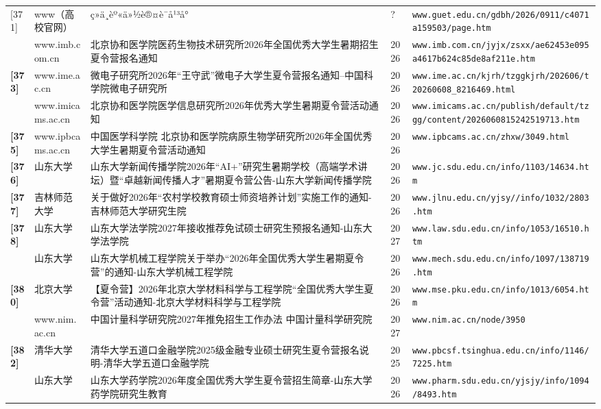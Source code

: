 {\begin{longtable}{@{}p{1.15cm}p{2.9cm}p{6.3cm}p{0.85cm}p{5.0cm}@{}}
[371] & www（高校官网） & ç»ä¸èº«ä»½è®¤è¯å¹³å° & ? & \texttt{www.guet.edu.cn/gdbh/2026/0911/c4071a159503/page.htm} \\
[372] & www.imb.com.cn & 北京协和医学院医药生物技术研究所2026年全国优秀大学生暑期招生夏令营报名通知 & 2026 & \texttt{www.imb.com.cn/jyjx/zsxx/ae62453e095a4617b624c85de8af211e.htm} \\
\textbf{[373]} & www.ime.ac.cn & 微电子研究所2026年“王守武”微电子大学生夏令营报名通知--中国科学院微电子研究所 & 2026 & \texttt{www.ime.ac.cn/kjrh/tzggkjrh/202606/t20260608\_8216469.html} \\
[374] & www.imicams.ac.cn & 北京协和医学院医学信息研究所2026年优秀大学生暑期夏令营活动通知 & 2026 & \texttt{www.imicams.ac.cn/publish/default/tzgg/content/2026060815242519713.htm} \\
\textbf{[375]} & www.ipbcams.ac.cn & 中国医学科学院 北京协和医学院病原生物学研究所2026年全国优秀大学生暑期夏令营活动通知 & 2026 & \texttt{www.ipbcams.ac.cn/zhxw/3049.html} \\
\textbf{[376]} & 山东大学 & 山东大学新闻传播学院2026年“AI+”研究生暑期学校（高端学术讲坛）暨“卓越新闻传播人才”暑期夏令营公告-山东大学新闻传播学院 & 2026 & \texttt{www.jc.sdu.edu.cn/info/1103/14634.htm} \\
\textbf{[377]} & 吉林师范大学 & 关于做好2026年“农村学校教育硕士师资培养计划”实施工作的通知-吉林师范大学研究生院 & 2026 & \texttt{www.jlnu.edu.cn/yjsy//info/1032/2803.htm} \\
\textbf{[378]} & 山东大学 & 山东大学法学院2027年接收推荐免试硕士研究生预报名通知-山东大学法学院 & 2027 & \texttt{www.law.sdu.edu.cn/info/1053/16510.htm} \\
[379] & 山东大学 & 山东大学机械工程学院关于举办“2026年全国优秀大学生暑期夏令营”的通知-山东大学机械工程学院 & 2026 & \texttt{www.mech.sdu.edu.cn/info/1097/138719.htm} \\
\textbf{[380]} & 北京大学 & 【夏令营】2026年北京大学材料科学与工程学院“全国优秀大学生夏令营”活动通知-北京大学材料科学与工程学院 & 2026 & \texttt{www.mse.pku.edu.cn/info/1013/6054.htm} \\
[381] & www.nim.ac.cn & 中国计量科学研究院2027年推免招生工作办法 \textbar{} 中国计量科学研究院 & 2027 & \texttt{www.nim.ac.cn/node/3950} \\
\textbf{[382]} & 清华大学 & 清华大学五道口金融学院2025级金融专业硕士研究生夏令营报名说明-清华大学五道口金融学院 & 2025 & \texttt{www.pbcsf.tsinghua.edu.cn/info/1146/7225.htm} \\
[383] & 山东大学 & 山东大学药学院2026年度全国优秀大学生夏令营招生简章-山东大学药学院研究生教育 & 2026 & \texttt{www.pharm.sdu.edu.cn/yjsjy/info/1094/8493.htm} \\

\end{longtable}}

